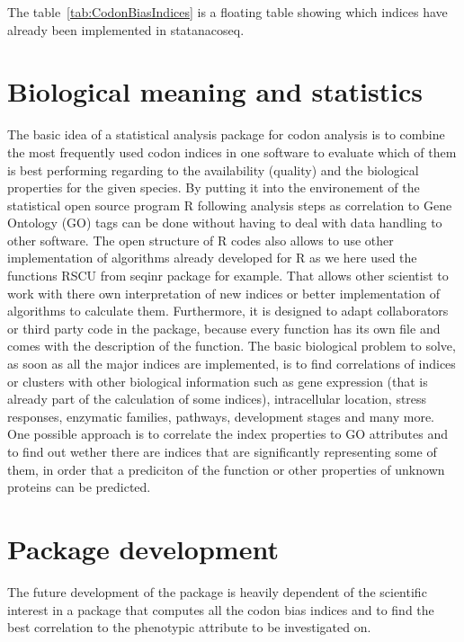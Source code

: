 The table~\ref{tab:CodonBiasIndices} is a floating table showing which indices have already been implemented in statanacoseq.

\section{Biological meaning and statistics}
The basic idea of a statistical analysis package for codon analysis is to combine the most frequently used codon indices in one software to evaluate which of them is best performing regarding to the availability (quality) and the biological properties for the given species. By putting it into the environement of the statistical open source program R following analysis steps as correlation to Gene Ontology (GO) tags can be done without having to deal with data handling to other software. The open structure of R codes also allows to use other implementation of algorithms already developed for R as we here used the functions RSCU from seqinr package for example. That allows other scientist to work with there own interpretation of new indices or better implementation of algorithms to calculate them. Furthermore, it is designed to adapt collaborators or third party code in the package, because every function has its own file and comes with the description of the function.
The basic biological problem to solve, as soon as all the major indices are implemented, is to find correlations of indices or clusters with other biological information such as gene expression (that is already part of the calculation of some indices), intracellular location, stress responses, enzymatic families, pathways, development stages and many more. One possible approach is to correlate the index properties to GO attributes and to find out wether there are indices that are significantly representing some of them, in order that a prediciton of the function or other properties of unknown proteins can be predicted.

\section{Package development}
The future development of the package is heavily dependent of the scientific interest in a package that computes all the codon bias indices and to find the best correlation to the phenotypic attribute to be investigated on. 